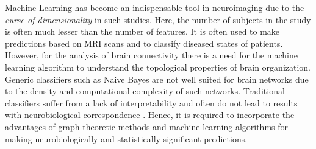 \documentclass[msthesis.tex]{subfiles}
\begin{document}
Machine Learning has become an indispensable tool in neuroimaging due to the  \textit{curse of dimensionality} in such studies. Here, the number of subjects in the study is often much lesser than the number of features. It is often used to make predictions based on \gls{MRI} scans and to classify diseased states of patients. However, for the analysis of brain connectivity there is a need for the machine learning algorithm to understand the topological properties of brain organization. Generic classifiers such as Naive Bayes are not well suited for brain networks due to the density and computational complexity of such networks. Traditional classifiers suffer from a lack of interpretability and often do not lead to results with neurobiological correspondence \citep{10.3389/fnagi.2017.00329}. Hence, it is required to incorporate the advantages of graph theoretic methods and machine learning algorithms for making neurobiologically and statistically significant predictions. 
\end{document}
